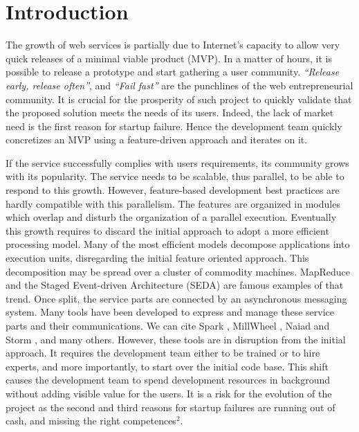 \section{Introduction}

The growth of web services is partially due to Internet's capacity to allow very quick releases of a minimal viable product (MVP).
In a matter of hours, it is possible to release a prototype and start gathering a user community.
\textit{``Release early, release often''}, and \textit{``Fail fast''} are the punchlines of the web entrepreneurial community.
It is crucial for the prosperity of such project to quickly validate that the proposed solution meets the needs of its users.
Indeed, the lack of market need is the first reason for startup failure.
Hence the development team quickly concretizes an MVP using a feature-driven approach and iterates on it.

If the service successfully complies with users requirements, its community grows with its popularity.
The service needs to be scalable, thus parallel, to be able to respond to this growth.
However, feature-based development best practices are hardly compatible with this parallelism.
The features are organized in modules which overlap and disturb the organization of a parallel execution.
Eventually this growth requires to discard the initial approach to adopt a more efficient processing model.
Many of the most efficient models decompose applications into execution units, disregarding the initial feature oriented approach.
This decomposition may be spread over a cluster of commodity machines. %
MapReduce \cite{Dean2008} and the Staged Event-driven Architecture (SEDA) \cite{Welsh2000} are famous examples of that trend. %
Once split, the service parts are connected by an asynchronous messaging system.
Many tools have been developed to express and manage these service parts and their communications.
We can cite Spark \cite{Zaharia2012}, MillWheel \cite{Akidau2013}, Naiad \cite{McSherry} and Storm \cite{Toshniwal2014}, and many others.
However, these tools are in disruption from the initial approach.
It requires the development team either to be trained or to hire experts, and more importantly, to start over the initial code base.
This shift causes the development team to spend development resources in background without adding visible value for the users.
It is a risk for the evolution of the project as the second and third reasons for startup failures are running out of cash, and missing the right competences$^2$.

